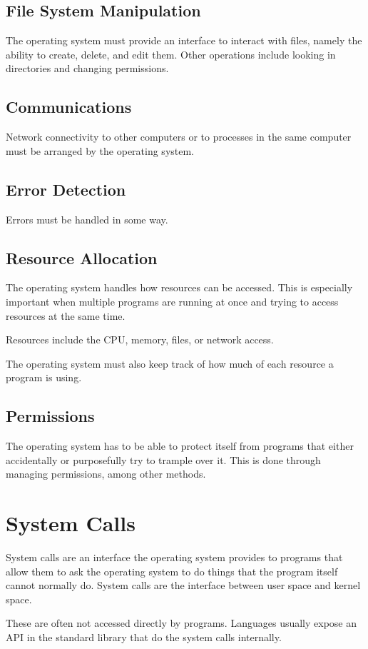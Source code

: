 \documentclass{article}
\begin{document}
\subsection{File System Manipulation}
The operating system must provide an interface to interact with files, namely
the ability to create, delete, and edit them. Other operations include looking
in directories and changing permissions.

\subsection{Communications}
Network connectivity to other computers or to processes in the same computer
must be arranged by the operating system.

\subsection{Error Detection}
Errors must be handled in some way.

\subsection{Resource Allocation}
The operating system handles how resources can be accessed. This is especially
important when multiple programs are running at once and trying to access
resources at the same time.

Resources include the CPU, memory, files, or network access.

The operating system must also keep track of how much of each resource a
program is using.

\subsection{Permissions}
The operating system has to be able to protect itself from programs that either
accidentally or purposefully try to trample over it. This is done through
managing permissions, among other methods.

\section{System Calls}
System calls are an interface the operating system provides to programs that
allow them to ask the operating system to do things that the program itself
cannot normally do. System calls are the interface between user space and
kernel space.

These are often not accessed directly by programs. Languages usually expose an
API in the standard library that do the system calls internally.
\end{document}
